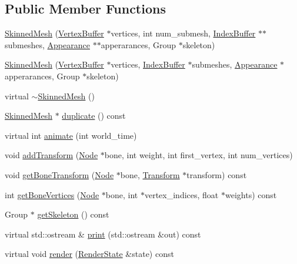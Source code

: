 \subsection*{Public Member Functions}
\begin{CompactItemize}
\item 
\hyperlink{classm3g_1_1SkinnedMesh_277419d6851b0e305f66a46095269915}{SkinnedMesh} (\hyperlink{classm3g_1_1VertexBuffer}{VertexBuffer} $\ast$vertices, int num\_\-submesh, \hyperlink{classm3g_1_1IndexBuffer}{IndexBuffer} $\ast$$\ast$submeshes, \hyperlink{classm3g_1_1Appearance}{Appearance} $\ast$$\ast$apperarances, Group $\ast$skeleton)
\item 
\hyperlink{classm3g_1_1SkinnedMesh_094bf88089897beeb8b8776e3bbb299d}{SkinnedMesh} (\hyperlink{classm3g_1_1VertexBuffer}{VertexBuffer} $\ast$vertices, \hyperlink{classm3g_1_1IndexBuffer}{IndexBuffer} $\ast$submeshes, \hyperlink{classm3g_1_1Appearance}{Appearance} $\ast$apperarances, Group $\ast$skeleton)
\item 
virtual \hyperlink{classm3g_1_1SkinnedMesh_c73da5b5c5f8f14fc241328b4b78928c}{$\sim$SkinnedMesh} ()
\item 
\hyperlink{classm3g_1_1SkinnedMesh}{SkinnedMesh} $\ast$ \hyperlink{classm3g_1_1SkinnedMesh_d3f422cf7656b73687d789094c7eae42}{duplicate} () const 
\item 
virtual int \hyperlink{classm3g_1_1SkinnedMesh_8aad1ceab4c2a03609c8a42324ce484d}{animate} (int world\_\-time)
\item 
void \hyperlink{classm3g_1_1SkinnedMesh_05077c4ee16f87ed4163f4d7a5f4f735}{addTransform} (\hyperlink{classm3g_1_1Node}{Node} $\ast$bone, int weight, int first\_\-vertex, int num\_\-vertices)
\item 
void \hyperlink{classm3g_1_1SkinnedMesh_e6c2fed8109053ded845e49f5c3b0c73}{getBoneTransform} (\hyperlink{classm3g_1_1Node}{Node} $\ast$bone, \hyperlink{classm3g_1_1Transform}{Transform} $\ast$transform) const 
\item 
int \hyperlink{classm3g_1_1SkinnedMesh_84ec0935b92b7ccc0aed7e66c4eac78f}{getBoneVertices} (\hyperlink{classm3g_1_1Node}{Node} $\ast$bone, int $\ast$vertex\_\-indices, float $\ast$weights) const 
\item 
Group $\ast$ \hyperlink{classm3g_1_1SkinnedMesh_ce7d69c2b600f6f01a46214db28e6f92}{getSkeleton} () const 
\item 
virtual std::ostream \& \hyperlink{classm3g_1_1SkinnedMesh_6fea17fa1532df3794f8cb39cb4f911f}{print} (std::ostream \&out) const 
\item 
virtual void \hyperlink{classm3g_1_1SkinnedMesh_8babc8a79b78615da51161e94029eea9}{render} (\hyperlink{structm3g_1_1RenderState}{RenderState} \&state) const 
\end{CompactItemize}


